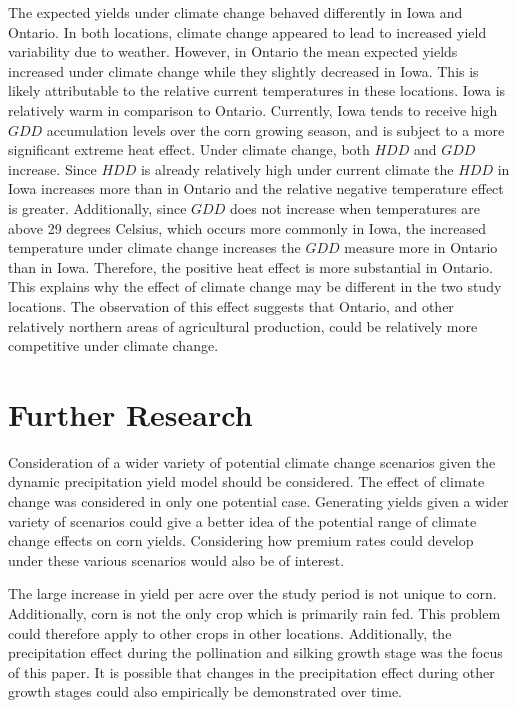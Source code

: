 The expected yields under climate change behaved differently in Iowa and Ontario. In both locations, climate change appeared to lead to increased yield variability due to weather. However, in Ontario the mean expected yields increased under climate change while they slightly decreased in Iowa. This is likely attributable to the relative current temperatures in these locations. Iowa is relatively warm in comparison to Ontario. Currently, Iowa tends to receive high $GDD$ accumulation levels over the corn growing season, and is subject to a more significant extreme heat effect. Under climate change, both $HDD$ and $GDD$ increase. Since $HDD$ is already relatively high under current climate the $HDD$ in Iowa increases more than in Ontario and the relative negative temperature effect is greater. Additionally, since $GDD$ does not increase when temperatures are above 29 degrees Celsius, which occurs more commonly in Iowa, the increased temperature under climate change increases the $GDD$ measure more in Ontario than in Iowa. Therefore, the positive heat effect is more substantial in Ontario. This explains why the effect of climate change may be different in the two study locations. The observation of this effect suggests that Ontario, and other relatively northern areas of agricultural production, could be relatively more competitive under climate change.

\section{Further Research}

Consideration of a wider variety of potential climate change scenarios given the dynamic precipitation yield model should be considered. The effect of climate change was considered in only one potential case. Generating yields given a wider variety of scenarios could give a better idea of the potential range of climate change effects on corn yields. Considering how premium rates could develop under these various scenarios would also be of interest.

The large increase in yield per acre over the study period is not unique to corn. Additionally, corn is not the only crop which is primarily rain fed. This problem could therefore apply to other crops in other locations. Additionally, the precipitation effect during the pollination and silking growth stage was the focus of this paper. It is possible that changes in the precipitation effect during other growth stages could also empirically be demonstrated over time. 

